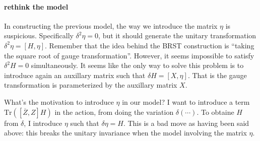 
\paragraph{rethink the model}
In constructing the previous model, the way we introduce the matrix $\eta$ is suspicious.
Specifically $\delta^2 \eta = 0$, but it should generate the unitary transformation $\delta^2 \eta = [H,\eta]$.
Remember that the idea behind the BRST construction is ``taking the square root of gauge transformation''.
However, it seems impossible to satisfy $\delta^2 H = 0$ simultaneously.
It seems like the only way to solve this problem is to introduce again an auxillary matrix such that $\delta H = [X,\eta]$.
That is the gauge transformation is parameterized by the auxillary matrix $X$.

What's the motivation to introduce $\eta$ in our model?
I want to introduce a term $\mathrm{Tr}([\overline{Z},Z]H)$ in the action,
from doing the variation $\delta(\cdots)$.
To obtaine $H$ from $\delta$, I introduce $\eta$ such that $\delta \eta = H$.
This is a bad move as having been said above: this breaks the unitary invariance when the model involving the matrix $\eta$.


